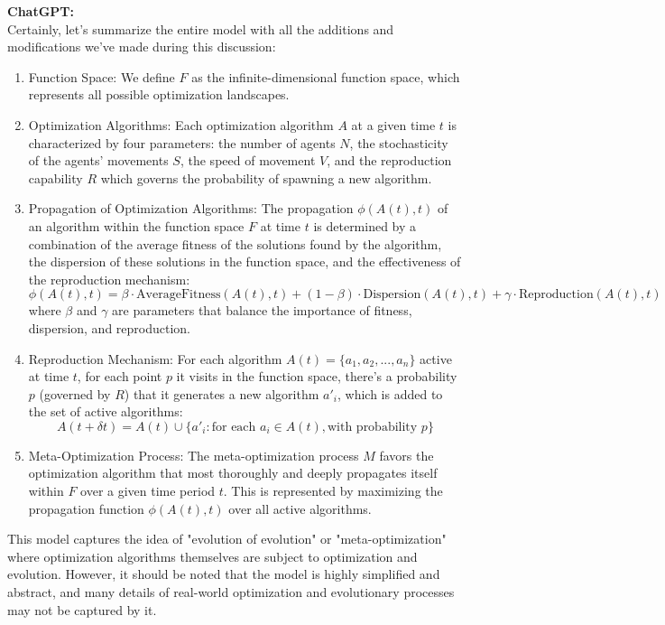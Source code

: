 \documentclass{article}[10pt]
\begin{document}
\noindent \textbf{ChatGPT:}\\
Certainly, let's summarize the entire model with all the additions and modifications we've made during this discussion:

\begin{enumerate}
    \item Function Space: We define \( F \) as the infinite-dimensional function space, which represents all possible optimization landscapes.
    \item Optimization Algorithms: Each optimization algorithm \( A \) at a given time \( t \) is characterized by four parameters: the number of agents \( N \), the stochasticity of the agents' movements \( S \), the speed of movement \( V \), and the reproduction capability \( R \) which governs the probability of spawning a new algorithm.
    \item Propagation of Optimization Algorithms: The propagation \( \phi(A(t), t) \) of an algorithm within the function space \( F \) at time \( t \) is determined by a combination of the average fitness of the solutions found by the algorithm, the dispersion of these solutions in the function space, and the effectiveness of the reproduction mechanism:
    \[
    \phi(A(t), t) = \beta \cdot \text{AverageFitness}(A(t), t) + (1 - \beta) \cdot \text{Dispersion}(A(t), t) + \gamma \cdot \text{Reproduction}(A(t), t)
    \]
    where \( \beta \) and \( \gamma \) are parameters that balance the importance of fitness, dispersion, and reproduction. 
    \item Reproduction Mechanism: For each algorithm \( A(t) = \{a_1, a_2, ..., a_n\} \) active at time \( t \), for each point \( p \) it visits in the function space, there's a probability \( p \) (governed by \( R \)) that it generates a new algorithm \( a'_i \), which is added to the set of active algorithms:
    \[
    A(t + \delta t) = A(t) \cup \{a'_i : \text{for each } a_i \in A(t), \text{with probability } p\}
    \]
    \item Meta-Optimization Process: The meta-optimization process \( M \) favors the optimization algorithm that most thoroughly and deeply propagates itself within \( F \) over a given time period \( t \). 
    This is represented by maximizing the propagation function \( \phi(A(t), t) \) over all active algorithms.
\end{enumerate}

This model captures the idea of "evolution of evolution" or "meta-optimization" where optimization algorithms themselves are subject to optimization and evolution. 
However, it should be noted that the model is highly simplified and abstract, and many details of real-world optimization and evolutionary processes may not be captured by it.\par
\end{document}
